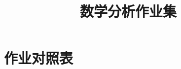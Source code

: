 \documentclass[b5paper]{memoir}
\begin{document}
\frontmatter
\title{数学分析作业集}
\author{\Large \Caffein}
\date{}
\maketitle
\tableofcontents
\mainmatter
\setcounter{chapter}{12}







\backmatter
\chapter{作业对照表}
\end{document}
